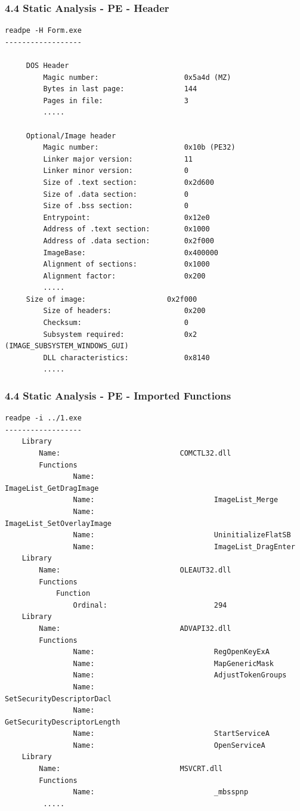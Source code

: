 \begin{frame}[fragile]
  \frametitle{4.4 Static Analysis - PE - Header}
  \begin{lstlisting}[basicstyle=\tiny]
readpe -H Form.exe
------------------

     DOS Header
         Magic number:                    0x5a4d (MZ)
         Bytes in last page:              144
         Pages in file:                   3
         .....

     Optional/Image header
         Magic number:                    0x10b (PE32)
         Linker major version:            11
         Linker minor version:            0
         Size of .text section:           0x2d600
         Size of .data section:           0
         Size of .bss section:            0
         Entrypoint:                      0x12e0
         Address of .text section:        0x1000
         Address of .data section:        0x2f000
         ImageBase:                       0x400000
         Alignment of sections:           0x1000
         Alignment factor:                0x200
         .....
	 Size of image:                   0x2f000
         Size of headers:                 0x200
         Checksum:                        0
         Subsystem required:              0x2 (IMAGE_SUBSYSTEM_WINDOWS_GUI)
         DLL characteristics:             0x8140
         .....
  \end{lstlisting}
\end{frame}


\begin{frame}[fragile]
  \frametitle{4.4 Static Analysis - PE - Imported Functions}
  \begin{lstlisting}[basicstyle=\tiny]
readpe -i ../1.exe
------------------
    Library
        Name:                            COMCTL32.dll
        Functions
                Name:                            ImageList_GetDragImage
                Name:                            ImageList_Merge
                Name:                            ImageList_SetOverlayImage
                Name:                            UninitializeFlatSB
                Name:                            ImageList_DragEnter
    Library
        Name:                            OLEAUT32.dll
        Functions
            Function
                Ordinal:                         294
    Library
        Name:                            ADVAPI32.dll
        Functions
                Name:                            RegOpenKeyExA
                Name:                            MapGenericMask
                Name:                            AdjustTokenGroups
                Name:                            SetSecurityDescriptorDacl
                Name:                            GetSecurityDescriptorLength
                Name:                            StartServiceA
                Name:                            OpenServiceA
    Library
        Name:                            MSVCRT.dll
        Functions
                Name:                            _mbsspnp
         .....
  \end{lstlisting}
\end{frame}


